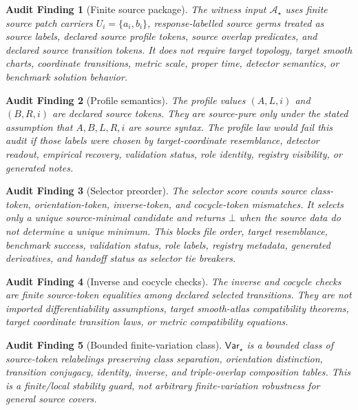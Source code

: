 \documentclass[11pt]{article}
\newcommand{\Bot}{\bot}
\newcommand{\Astar}{\mathcal A_{\star}}
\newcommand{\Varstar}{\mathsf{Var}_{\star}}
\newtheorem{audit}{Audit Finding}
\begin{document}
\begin{audit}[Finite source package]
The witness input \(\Astar\) uses finite source patch carriers
\(U_i=\{a_i,b_i\}\), response-labelled source germs treated as source labels,
declared source profile tokens, source overlap predicates, and declared source
transition tokens. It does not require target topology, target smooth charts,
coordinate transitions, metric scale, proper time, detector semantics, or
benchmark solution behavior.
\end{audit}

\begin{audit}[Profile semantics]
The profile values \((A,L,i)\) and \((B,R,i)\) are declared source tokens.
They are source-pure only under the stated assumption that \(A,B,L,R,i\) are
source syntax. The profile law would fail this audit if those labels were
chosen by target-coordinate resemblance, detector readout, empirical recovery,
validation status, role identity, registry visibility, or generated notes.
\end{audit}

\begin{audit}[Selector preorder]
The selector score counts source class-token, orientation-token, inverse-token,
and cocycle-token mismatches. It selects only a unique source-minimal
candidate and returns \(\Bot\) when the source data do not determine a unique
minimum. This blocks file order, target resemblance, benchmark success,
validation status, role labels, registry metadata, generated derivatives, and
handoff status as selector tie breakers.
\end{audit}

\begin{audit}[Inverse and cocycle checks]
The inverse and cocycle checks are finite source-token equalities among
declared selected transitions. They are not imported differentiability
assumptions, target smooth-atlas compatibility theorems, target coordinate
transition laws, or metric compatibility equations.
\end{audit}

\begin{audit}[Bounded finite-variation class]
\(\Varstar\) is a bounded class of source-token relabelings preserving class
separation, orientation distinction, transition conjugacy, identity, inverse,
and triple-overlap composition tables. This is a finite/local stability guard,
not arbitrary finite-variation robustness for general source covers.
\end{audit}
\end{document}
